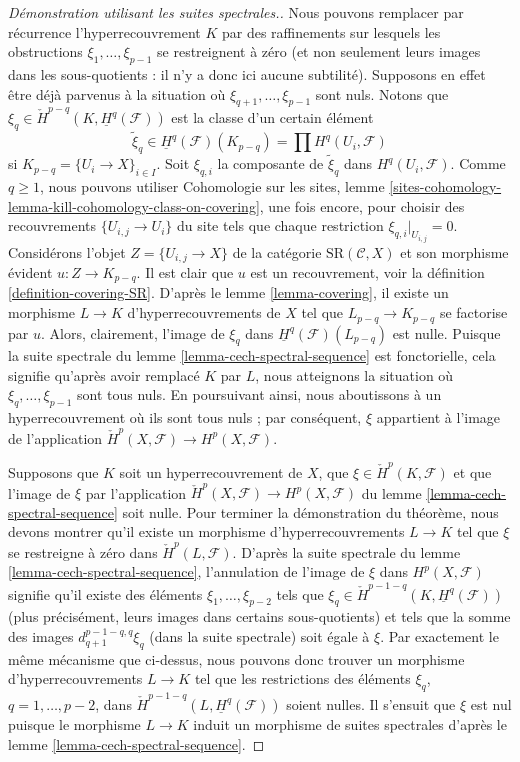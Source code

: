 \begin{proof}[Démonstration utilisant les suites spectrales.]
\medskip\noindent
Nous pouvons remplacer par récurrence l'hyperrecouvrement $K$ par des raffinements
sur lesquels les obstructions $\xi_1, \ldots, \xi_{p - 1}$ se restreignent à zéro
(et non seulement leurs images
dans les sous-quotients : il n'y a donc ici aucune subtilité). Supposons en effet être
déjà parvenus à la situation où
$\xi_{q + 1}, \ldots, \xi_{p - 1}$ sont nuls.
Notons que $\xi_q \in \check{H}^{p - q}(K, \underline{H}^q(\mathcal{F}))$
est la classe d'un certain élément
$$
\tilde \xi_q \in
\underline{H}^q(\mathcal{F})(K_{p - q}) =
\prod H^q(U_i, \mathcal{F})
$$
si $K_{p - q} = \{U_i \to X\}_{i \in I}$. Soit $\xi_{q, i}$
la composante de $\tilde \xi_q$ dans $H^q(U_i, \mathcal{F})$.
Comme $q \geq 1$, nous pouvons utiliser
Cohomologie sur les sites,
lemme \ref{sites-cohomology-lemma-kill-cohomology-class-on-covering},
une fois encore, pour choisir des recouvrements $\{U_{i, j} \to U_i\}$
du site tels que chaque restriction $\xi_{q, i}|_{U_{i, j}} = 0$.
Considérons l'objet $Z = \{U_{i, j} \to X\}$ de la catégorie
$\text{SR}(\mathcal{C}, X)$ et son morphisme évident
$u : Z \to K_{p - q}$. Il est clair que $u$ est un recouvrement, voir la
définition \ref{definition-covering-SR}. D'après le
lemme \ref{lemma-covering}, il
existe un morphisme $L \to K$ d'hyperrecouvrements de $X$ tel que
$L_{p - q} \to K_{p - q}$ se factorise par $u$. Alors, clairement,
l'image de $\xi_q$ dans $\underline{H}^q(\mathcal{F})(L_{p - q})$
est nulle. Puisque la suite spectrale du
lemme \ref{lemma-cech-spectral-sequence}
est fonctorielle, cela signifie qu'après avoir remplacé $K$ par $L$, nous atteignons la
situation où $\xi_q, \ldots, \xi_{p - 1}$ sont tous nuls.
En poursuivant ainsi, nous aboutissons à un hyperrecouvrement où ils sont tous
nuls ; par conséquent, $\xi$ appartient à l'image de l'application
$\check{H}^p(X, \mathcal{F}) \to H^p(X, \mathcal{F})$.

\medskip\noindent
Supposons que $K$ soit un hyperrecouvrement de $X$, que
$\xi \in \check{H}^p(K, \mathcal{F})$ et que l'image de
$\xi$ par l'application
$\check{H}^p(X, \mathcal{F}) \to H^p(X, \mathcal{F})$ du
lemme \ref{lemma-cech-spectral-sequence}
soit nulle. Pour terminer la démonstration du théorème, nous devons montrer
qu'il existe un morphisme d'hyperrecouvrements $L \to K$ tel que
$\xi$ se restreigne à zéro dans $\check{H}^p(L, \mathcal{F})$.
D'après la suite spectrale du lemme \ref{lemma-cech-spectral-sequence},
l'annulation de l'image de $\xi$ dans $H^p(X, \mathcal{F})$
signifie qu'il existe des éléments $\xi_1, \ldots, \xi_{p - 2}$
tels que $\xi_q \in \check{H}^{p - 1 - q}(K, \underline{H}^q(\mathcal{F}))$
(plus précisément, leurs images dans certains sous-quotients)
et tels que la somme des images $d_{q + 1}^{p - 1 - q, q}\xi_q$ (dans la suite
spectrale) soit égale à $\xi$. Par exactement le même mécanisme que ci-dessus,
nous pouvons donc trouver un morphisme d'hyperrecouvrements $L \to K$ tel que
les restrictions des éléments $\xi_q$, $q = 1, \ldots, p - 2$,
dans $\check{H}^{p - 1 - q}(L, \underline{H}^q(\mathcal{F}))$ soient nulles.
Il s'ensuit que $\xi$ est nul puisque le morphisme $L \to K$
induit un morphisme de suites spectrales d'après le
lemme \ref{lemma-cech-spectral-sequence}.
\end{proof}

